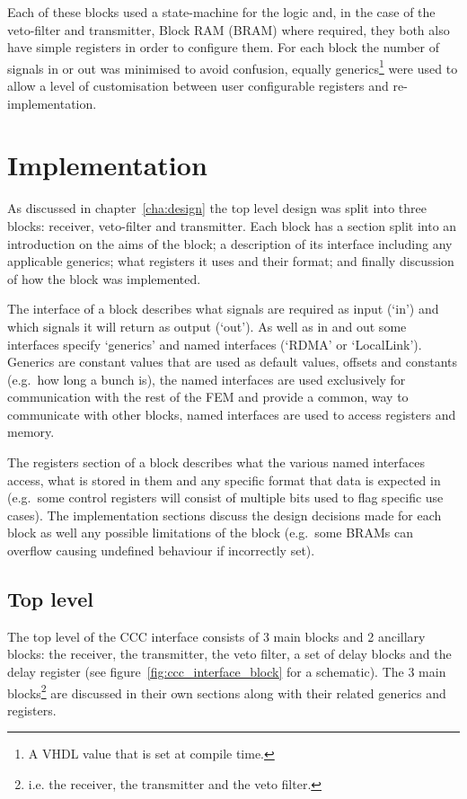 Each of these blocks used a state-machine for the logic and, in the case of the veto-filter and transmitter, Block RAM (BRAM) where required, they both also have simple registers in order to configure them. For each block the number of signals in or out was minimised to avoid confusion, equally generics\footnote{A VHDL value that is set at compile time.} were used to allow a level of customisation between user configurable registers and re-implementation.
\chapter{Implementation} %
\label{cha:implementation}
As discussed in chapter~\ref{cha:design} the top level design was split into three blocks: receiver, veto-filter and transmitter. Each block has a section split into an introduction on the aims of the block; a description of its interface including any applicable generics; what registers it uses and their format; and finally discussion of how the block was implemented. 

The interface of a block describes what signals are required as input (`in') and which signals it will return as output (`out'). As well as in and out some interfaces specify `generics' and named interfaces (`RDMA' or `LocalLink'). Generics are constant values that are used as default values, offsets and constants (e.g.\ how long a bunch is), the named interfaces are used exclusively for communication with the rest of the FEM and provide a common, way to communicate with other blocks, named interfaces are used to access registers and memory.

The registers section of a block describes what the various named interfaces access, what is stored in them and any specific format that data is expected in (e.g.\ some control registers will consist of multiple bits used to flag specific use cases). The implementation sections discuss the design decisions made for each block as well any possible limitations of the block (e.g.\ some BRAMs can overflow causing undefined behaviour if incorrectly set).

\section{Top level} %
\label{cha:top_level}
The top level of the CCC interface consists of 3 main blocks and 2 ancillary blocks: the receiver, the transmitter, the veto filter, a set of delay blocks and the delay register (see figure~\ref{fig:ccc_interface_block} for a schematic). The 3 main blocks\footnote{i.e. the receiver, the transmitter and the veto filter.} are discussed in their own sections along with their related generics and registers.  
